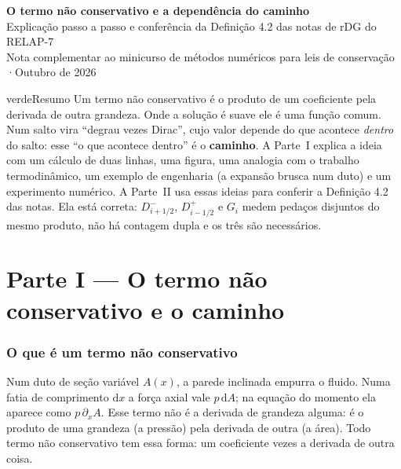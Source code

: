 \documentclass[11pt,a4paper]{article}
\theoremstyle{definition}
\theoremstyle{remark}
\newcommand{\dd}{\mathrm{d}}
\begin{document}
\begin{center}
{\LARGE\bfseries O termo não conservativo e a dependência do caminho}\\[6pt]
{\large Explicação passo a passo e conferência da Definição 4.2 das notas de rDG do RELAP-7}\\[6pt]
{\small Nota complementar ao minicurso de métodos numéricos para leis de conservação \quad·\quad Outubro de 2026}
\end{center}

\begin{quadro}{verde}{Resumo}
Um termo não conservativo é o produto de um coeficiente pela derivada de outra grandeza. Onde a solução é suave ele é uma função comum. Num salto vira ``degrau vezes Dirac'', cujo valor depende do que acontece \emph{dentro} do salto: esse ``o que acontece dentro'' é o \textbf{caminho}. A Parte~I explica a ideia com um cálculo de duas linhas, uma figura, uma analogia com o trabalho termodinâmico, um exemplo de engenharia (a expansão brusca num duto) e um experimento numérico. A Parte~II usa essas ideias para conferir a Definição 4.2 das notas. Ela está correta: $D^-_{i+1/2}$, $D^+_{i-1/2}$ e $G_i$ medem pedaços disjuntos do mesmo produto, não há contagem dupla e os três são necessários.
\end{quadro}

\tableofcontents

\part*{Parte I --- O termo não conservativo e o caminho}

\section{O que é um termo não conservativo}

\begin{intuicao}
Num duto de seção variável $A(x)$, a parede inclinada empurra o fluido. Numa fatia de comprimento $\dd x$ a força axial vale $p\,\dd A$; na equação do momento ela aparece como $p\,\partial_x A$. Esse termo não é a derivada de grandeza alguma: é o produto de uma grandeza (a pressão) pela derivada de outra (a área). Todo termo não conservativo tem essa forma: um coeficiente vezes a derivada de outra coisa.
\end{intuicao}
\end{document}
